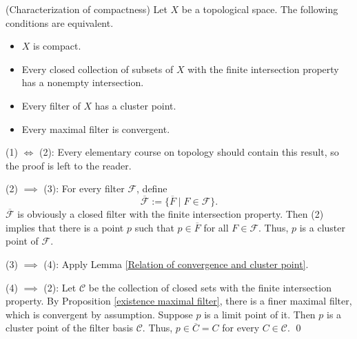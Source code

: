 \documentclass{report}
\begin{document}
\begin{prp}\label{characterize compact} (Characterization of compactness)
    Let \( X \) be a topological space. The following conditions are equivalent.
    \begin{itemize}
        \item[(1)] \( X \) is compact.
        \item[(2)] Every closed collection of subsets of \( X \) with the finite intersection property has a nonempty intersection.
        \item[(3)] Every filter of \( X \) has a cluster point.
        \item[(4)] Every maximal filter is convergent.
    \end{itemize}
\end{prp}
\begin{prf}
    (1) \( \iff \) (2):
    Every elementary course on topology should contain this result, so the proof is left to the reader.

    (2) \( \implies \) (3): For every filter \( \mathscr{F} \), define
    \begin{equation*}
        \overline{\mathscr{F}} := \{\overline{F} \mid F \in \mathscr{F}\}.
    \end{equation*}
    \( \overline{\mathscr{F}} \) is obviously a closed filter with the finite intersection property. Then (2) implies that there is a point \( p \) such that \( p \in \overline{F}\) for all \( F \in \mathscr{F} \). Thus, \( p \) is a cluster point of \( \mathscr{F} \).

    (3) \( \implies \) (4):
    Apply Lemma \ref{Relation of convergence and cluster point}.

    (4) \( \implies \) (2): Let \( \mathscr{C} \) be the collection of closed sets with the finite intersection property. By Proposition \ref{existence maximal filter}, there is a finer maximal filter, which is convergent by assumption. Suppose \( p \) is a limit point of it. Then \( p \) is a cluster point of the filter basis \( \mathscr{C} \). Thus, \( p \in \overline{C} = C \) for every \( C \in \mathscr{C} \).
    \qed\end{prf}
\end{document}
